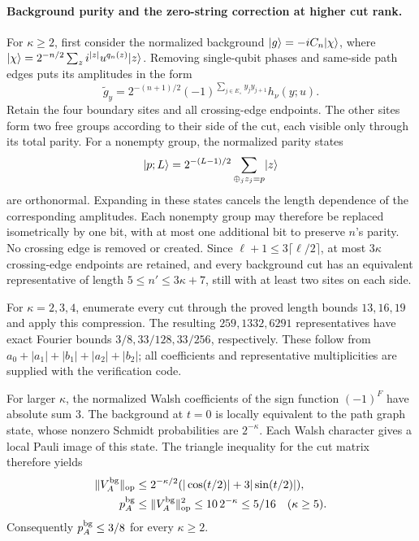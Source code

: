 \paragraph*{Background purity and the zero-string correction at higher cut rank.}
For $\kappa\ge2$, first consider the normalized background $\lvert g\rangle=-iC_n\lvert \chi\rangle$, where $\lvert \chi\rangle=2^{-n/2}\sum_z i^{|z|}u^{q_n(z)}\lvert z\rangle$. Removing single-qubit phases and same-side path edges puts its amplitudes in the form
\begin{equation}
 \widetilde g_y=2^{-(n+1)/2}
 (-1)^{\sum_{j\in E_\times}y_jy_{j+1}}h_\nu(y;u).
 \label{physics:background-compression}
\end{equation}
Retain the four boundary sites and all crossing-edge endpoints. The other sites form two free groups according to their side of the cut, each visible only through its total parity. For a nonempty group, the normalized parity states
\begin{equation}
 \lvert p;L\rangle=2^{-(L-1)/2}\sum_{\oplus_jz_j=p}\lvert z\rangle
 \label{physics:parity-isometry}
\end{equation}
are orthonormal. Expanding in these states cancels the length dependence of the corresponding amplitudes. Each nonempty group may therefore be replaced isometrically by one bit, with at most one additional bit to preserve $n$'s parity. No crossing edge is removed or created. Since $\ell+1\le3\lceil\ell/2\rceil$, at most $3\kappa$ crossing-edge endpoints are retained, and every background cut has an equivalent representative of length $5\le n'\le3\kappa+7$, still with at least two sites on each side.

For $\kappa=2,3,4$, enumerate every cut through the proved length bounds $13,16,19$ and apply this compression. The resulting $259,1332,6291$ representatives have exact Fourier bounds $3/8,33/128,33/256$, respectively. These follow from $a_0+|a_1|+|b_1|+|a_2|+|b_2|$; all coefficients and representative multiplicities are supplied with the verification code.

For larger $\kappa$, the normalized Walsh coefficients of the sign function $(-1)^F$ have absolute sum $3$. The background at $t=0$ is locally equivalent to the path graph state, whose nonzero Schmidt probabilities are $2^{-\kappa}$. Each Walsh character gives a local Pauli image of this state. The triangle inequality for the cut matrix therefore yields
\begin{equation}
 \begin{aligned}
 \|V_A^{\rm bg}\|_{\rm op}
 &\le2^{-\kappa/2}(|\cos(t/2)|+3|\sin(t/2)|),\\
 p_A^{\rm bg}&\le\|V_A^{\rm bg}\|_{\rm op}^2
 \le10\,2^{-\kappa}\le5/16\quad(\kappa\ge5).
 \end{aligned}
 \label{physics:walsh-purity-bound}
\end{equation}
Consequently $p_A^{\rm bg}\le3/8$ for every $\kappa\ge2$.

